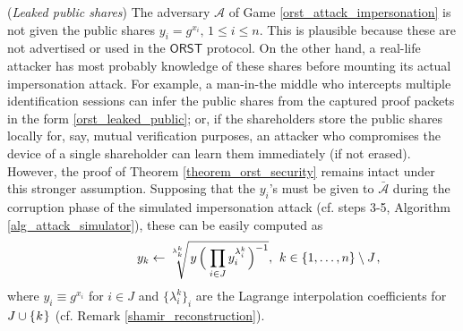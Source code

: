 \documentclass{iacrtrans}
\begin{document}
\begin{rem}\label{rem_leaked_public_shares}
(\textit{Leaked public shares})
The adversary $\mathcal{A}$ of Game \ref{orst_attack_impersonation}
is not given the public shares
$y_i = g ^ {x_i},\hspace{2pt} 1 \le i \le n$.
This is plausible because these are not advertised or used
in the $\mathsf{ORST}$ protocol.
On the other hand, a real-life attacker has most probably
knowledge of these shares before mounting
its actual impersonation attack.
For example, a man-in-the middle who intercepts multiple
identification sessions can infer the public shares
from the captured proof packets in the form
\eqref{orst_leaked_public};
or, if the shareholders store the public shares
locally for, say, mutual verification purposes,
an attacker who compromises the device of a single shareholder
can learn them immediately (if not erased).
However, the proof of Theorem \ref{theorem_orst_security}
remains intact under this stronger assumption.
Supposing that the $y_i$'s must be given to $\mathcal{\bar{A}}$
during the corruption phase of the simulated impersonation attack
(cf. steps 3-5, Algorithm \ref{alg_attack_simulator}),
these can be easily computed as
\vspace{5pt}
\begin{equation*}
\hspace{42pt}
y_k \leftarrow
\sqrt[\leftroot{0}\uproot{10}\lambda_k^k]{\hspace{1.5pt}y\hspace{1.5pt}
\Big(\hspace{1pt}\prod_{i \in J} y_i^{\lambda_i^k}\hspace{1pt}\Big)^{-1}},
\hspace{4pt} k \in \{1, \dots, n\} \setminus J\hspace{1pt},
\vspace{5pt}
\end{equation*}
where $y_i \equiv g ^ {x_i}$ for $i \in J$
and $\{\lambda_i^k\}_i$
are the Lagrange interpolation coefficients for
$J \cup \{\hspace{0.5pt}k\hspace{0.5pt}\}$
(cf. Remark \ref{shamir_reconstruction}).
\end{rem}
\end{document}
